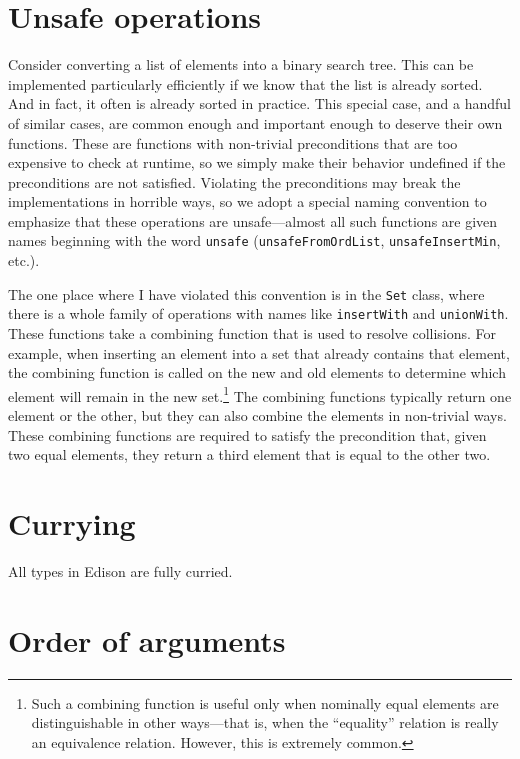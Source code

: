 \documentclass{report}
\newcommand{\cd}{\texttt}
\begin{document}
\section{Unsafe operations}

Consider converting a list of elements into a binary search tree.
This can be implemented particularly efficiently if we know that the list is 
already sorted.  And in fact, it often is already sorted in practice.
This special case, and a handful of similar cases, are common enough and
important enough to deserve their own functions.  These are functions
with non-trivial preconditions that are too expensive to check at runtime,
so we simply make their behavior undefined if the preconditions are not
satisfied.  Violating the preconditions may break the implementations in
horrible ways, so we adopt a special naming convention to emphasize that
these operations are unsafe---almost all such functions are given names 
beginning with the word \cd{unsafe} (\cd{unsafeFromOrdList},
\cd{unsafeInsertMin}, etc.).

The one place where I have violated this convention is in the \cd{Set}
class, where there is a whole family of operations with names like
\cd{insertWith} and \cd{unionWith}.  These functions take a combining
function that is used to resolve collisions.  For example, when
inserting an element into a set that already contains that element,
the combining function is called on the new and old elements to
determine which element will remain in the new set.\footnote{
  Such a combining function is useful only when nominally
  equal elements are distinguishable in other ways---that is, when
  the ``equality'' relation is really an equivalence relation.
  However, this is extremely common.
}  
The combining functions typically return one element or the other, but
they can also combine the elements in non-trivial ways.  These
combining functions are required to satisfy the precondition that,
given two equal elements, they return a third element that is equal to
the other two.

\section{Currying}

All types in Edison are fully curried.

\section{Order of arguments}
\end{document}
